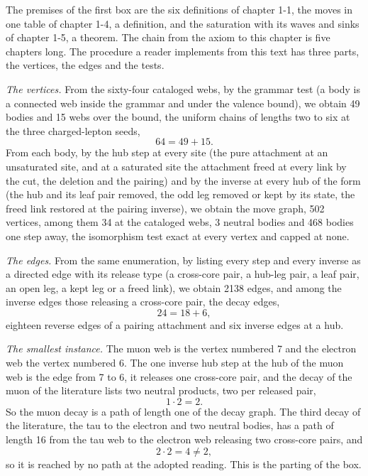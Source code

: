 \begin{chproof}
The premises of the first box are the six definitions of chapter 1-1, the moves in one table of chapter 1-4, a definition, and the saturation with its waves and sinks of chapter 1-5, a theorem. The chain from the axiom to this chapter is five chapters long. The procedure a reader implements from this text has three parts, the vertices, the edges and the tests.

\emph{The vertices.} From the sixty-four cataloged webs, by the grammar test (a body is a connected web inside the grammar and under the valence bound), we obtain 49 bodies and 15 webs over the bound, the uniform chains of lengths two to six at the three charged-lepton seeds,
\begin{equation}
64 = 49 + 15 .
\end{equation}
From each body, by the hub step at every site (the pure attachment at an unsaturated site, and at a saturated site the attachment freed at every link by the cut, the deletion and the pairing) and by the inverse at every hub of the form (the hub and its leaf pair removed, the odd leg removed or kept by its state, the freed link restored at the pairing inverse), we obtain the move graph, 502 vertices, among them 34 at the cataloged webs, 3 neutral bodies and 468 bodies one step away, the isomorphism test exact at every vertex and capped at none.

\emph{The edges.} From the same enumeration, by listing every step and every inverse as a directed edge with its release type (a cross-core pair, a hub-leg pair, a leaf pair, an open leg, a kept leg or a freed link), we obtain 2138 edges, and among the inverse edges those releasing a cross-core pair, the decay edges,
\begin{equation}
24 = 18 + 6 ,
\end{equation}
eighteen reverse edges of a pairing attachment and six inverse edges at a hub.

\emph{The smallest instance.} The muon web is the vertex numbered 7 and the electron web the vertex numbered 6. The one inverse hub step at the hub of the muon web is the edge from 7 to 6, it releases one cross-core pair, and the decay of the muon of the literature lists two neutral products, two per released pair,
\begin{equation}
1 \cdot 2 = 2 .
\end{equation}
So the muon decay is a path of length one of the decay graph. The third decay of the literature, the tau to the electron and two neutral bodies, has a path of length 16 from the tau web to the electron web releasing two cross-core pairs, and
\begin{equation}
2 \cdot 2 = 4 \neq 2 ,
\end{equation}
so it is reached by no path at the adopted reading. This is the parting of the box.


\end{chproof}
